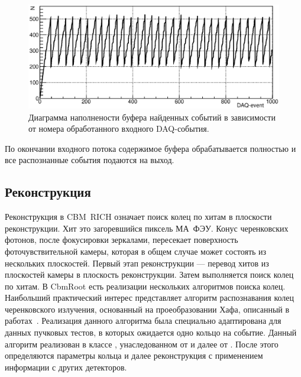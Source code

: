\begin{figure}
\includegraphics[width=1.0\textwidth]{pictures/16_Buff.eps}
\caption{Диаграмма наполнености буфера найденных событий в зависимости от номера обработанного входного DAQ-события.}
\label{fig:Buffer}
\end{figure}

По окончании входного потока содержимое буфера обрабатывается полностью и все распознанные события подаются на выход.

\subsection{Реконструкция}

Реконструкция в CBM~RICH означает поиск колец по хитам в плоскости реконструкции. Хит это загоревшийся пиксель МА~ФЭУ. Конус черенковских фотонов, после фокусировки зеркалами, пересекает поверхность фоточувствительной камеры, которая в общем случае может состоять из нескольких плоскостей. Первый этап реконструкции --- перевод хитов из плоскостей камеры в плоскость реконструкции. Затем выполняется поиск колец по хитам. В CbmRoot есть реализации нескольких алгоритмов поиска колец. Наибольший практический интерес представляет алгоритм распознавания колец черенковского излучения, основанный на проеобразовании Хафа, описанный в работах~\cite{RECOPEPAN, RECO2}. Реализация данного алгоритма была специально адаптирована для данных пучковых тестов, в которых ожидается одно кольцо на событие. Данный алгоритм реализован в классе , унаследованном от  и далее от . После этого определяются параметры кольца и далее реконструкция с применением информации с других детекторов.
